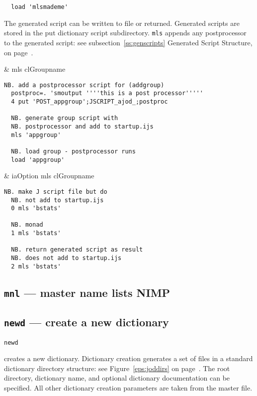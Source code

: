 \begin{verbatim}
  load 'mlsmademe'
\end{verbatim}

The generated script can be written to file or returned. 
Generated scripts are stored in the put dictionary script subdirectory.  
\texttt{mls} appends any postprocessor to the generated script: 
see subsection~\ref{ss:genscripts} Generated Script Structure, on page~\pageref{ss:genscripts}.

\begin{wordhead}
\monad & mls clGroupname \\
\end{wordhead}
\begin{lstlisting}[frame=single,framerule=0pt] 
  NB. add a postprocessor script for (addgroup) 
  postproc=. 'smoutput ''''this is a post processor'''''
  4 put 'POST_appgroup';JSCRIPT_ajod_;postproc  

  NB. generate group script with 
  NB. postprocessor and add to startup.ijs
  mls 'appgroup' 
  
  NB. load group - postprocessor runs
  load 'appgroup' 
\end{lstlisting}

\begin{wordhead}
\dyad & iaOption mls clGroupname \\
\end{wordhead}
\begin{lstlisting}[frame=single,framerule=0pt] 
  NB. make J script file but do 
  NB. not add to startup.ijs
  0 mls 'bstats' 

  NB. monad 
  1 mls 'bstats' 

  NB. return generated script as result 
  NB. does not add to startup.ijs  
  2 mls 'bstats' 
\end{lstlisting}

\subsection{\texttt{mnl} --- master name lists NIMP}\label{ss:mnl}

\subsection{\texttt{newd} --- create a new dictionary}\label{ss:newd} 

 \hypertarget{il:newd}{\texttt{newd}} creates 
 a new dictionary. 
 Dictionary creation generates
 a set of files in a standard dictionary directory structure:
 see Figure~\ref{eps:joddirs} on page~\pageref{eps:joddirs}.
  The root directory, dictionary name, and optional dictionary 
 documentation can be specified. All other dictionary 
 creation parameters are taken from the master file.
 
